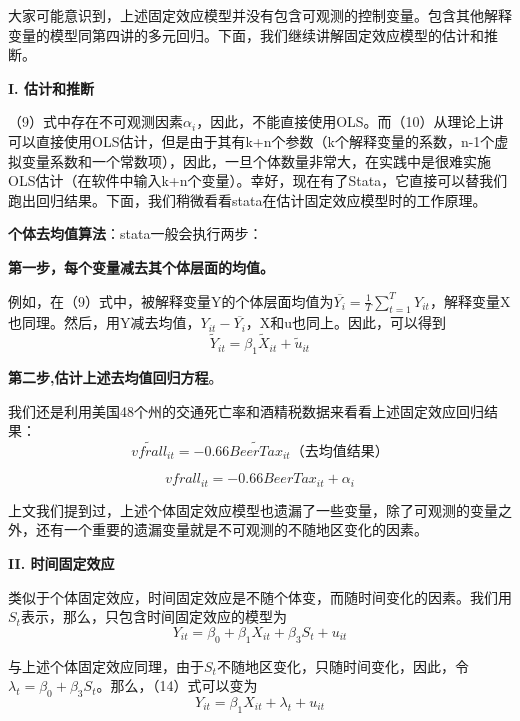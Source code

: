 \documentclass[cn,10pt,math=newtx,citestyle=gb7714-2015,bibstyle=gb7714-2015]{elegantbook}
\begin{document}
大家可能意识到，上述固定效应模型并没有包含可观测的控制变量。包含其他解释变量的模型同第四讲的多元回归。下面，我们继续讲解固定效应模型的估计和推断。

\textbf{I. 估计和推断}

（9）式中存在不可观测因素$\alpha_i$，因此，不能直接使用OLS。而（10）从理论上讲可以直接使用OLS估计，但是由于其有k+n个参数（k个解释变量的系数，n-1个虚拟变量系数和一个常数项），因此，一旦个体数量非常大，在实践中是很难实施OLS估计（在软件中输入k+n个变量）。幸好，现在有了Stata，它直接可以替我们跑出回归结果。下面，我们稍微看看stata在估计固定效应模型时的工作原理。

\textbf{个体去均值算法}：stata一般会执行两步：

\textbf{第一步，每个变量减去其个体层面的均值。}

例如，在（9）式中，被解释变量Y的个体层面均值为$\overline{Y_i}=\frac{1}{T}\sum_{t=1}^{T}Y_{it}$，解释变量X也同理。然后，用Y减去均值，$Y_{it}-\overline{Y_i}$，X和u也同上。因此，可以得到
\begin{equation}
	\tilde{Y}_{it}=\beta_{1}\tilde{X}_{it}+\tilde{u}_{it}
\end{equation}

\textbf{第二步,估计上述去均值回归方程}。

我们还是利用美国48个州的交通死亡率和酒精税数据来看看上述固定效应回归结果：
\begin{equation}
	\tilde{vfrall}_{it}=-0.66\tilde{BeerTax}_{it}（去均值结果）
\end{equation}

\begin{equation}
	vfrall_{it}=-0.66BeerTax_{it}+\alpha_i
\end{equation}

上文我们提到过，上述个体固定效应模型也遗漏了一些变量，除了可观测的变量之外，还有一个重要的遗漏变量就是不可观测的不随地区变化的因素。

\textbf{II. 时间固定效应}

类似于个体固定效应，时间固定效应是不随个体变，而随时间变化的因素。我们用$S_t$表示，那么，只包含时间固定效应的模型为
\begin{equation}
	Y_{it}=\beta_{0}+\beta_{1}X_{it}+\beta_{3}S_t+u_{it}
\end{equation}

与上述个体固定效应同理，由于$S_t$不随地区变化，只随时间变化，因此，令$\lambda_t=\beta_{0}+\beta_{3}S_t$。那么，（14）式可以变为
\begin{equation}
	Y_{it}=\beta_{1}X_{it}+\lambda_t+u_{it}
\end{equation}
\end{document}
